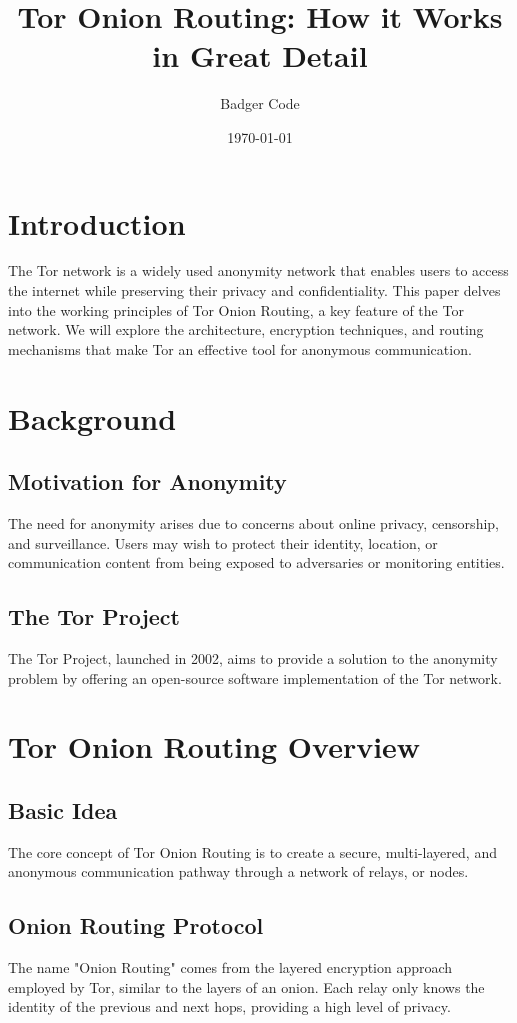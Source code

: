 \documentclass{article}
\title{Tor Onion Routing: How it Works in Great Detail}
\author{Badger Code}
\date{\today}
\begin{document}
\maketitle

\section{Introduction}
The Tor network is a widely used anonymity network that enables users to access the internet while preserving their privacy and confidentiality. This paper delves into the working principles of Tor Onion Routing, a key feature of the Tor network. We will explore the architecture, encryption techniques, and routing mechanisms that make Tor an effective tool for anonymous communication.

\section{Background}
\subsection{Motivation for Anonymity}
The need for anonymity arises due to concerns about online privacy, censorship, and surveillance. Users may wish to protect their identity, location, or communication content from being exposed to adversaries or monitoring entities.

\subsection{The Tor Project}
The Tor Project, launched in 2002, aims to provide a solution to the anonymity problem by offering an open-source software implementation of the Tor network.

\section{Tor Onion Routing Overview}
\subsection{Basic Idea}
The core concept of Tor Onion Routing is to create a secure, multi-layered, and anonymous communication pathway through a network of relays, or nodes.

\subsection{Onion Routing Protocol}
The name "Onion Routing" comes from the layered encryption approach employed by Tor, similar to the layers of an onion. Each relay only knows the identity of the previous and next hops, providing a high level of privacy.
\end{document}

